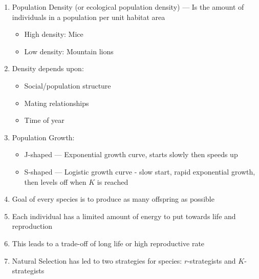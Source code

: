 \documentclass[12pt]{article}
\begin{document}
\begin{enumerate}
\begin{itemize}
    \end{itemize}

  \item Population Density (or ecological population density) — Is the amount of individuals in a population per unit habitat area

    \begin{itemize}

      \item High density: Mice

      \item Low density: Mountain lions

    \end{itemize}

  \item Density depends upon:

    \begin{itemize}

      \item Social/population structure

      \item Mating relationships

      \item Time of year

    \end{itemize}

  \item Population Growth:

    \begin{itemize}

      \item J-shaped — Exponential growth curve, starts slowly then speeds up

      \item S-shaped — Logistic growth curve - slow start, rapid exponential growth, then levels off when $K$ is reached

    \end{itemize}

  \item Goal of every species is to produce as many offspring as possible

  \item Each individual has a limited amount of energy to put towards life and reproduction

  \item This leads to a trade-off of long life or high reproductive rate

  \item Natural Selection has led to two strategies for species: $r$-strategists and $K$-strategists


\end{enumerate}
\end{document}
